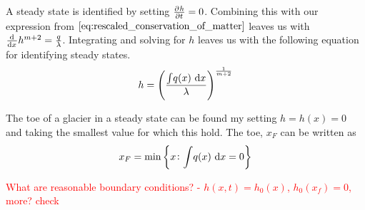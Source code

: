 \label{sec:steady_state}

A steady state is identified by setting $\pd{h}{t} = 0$. Combining this with our expression from $\eqref{eq:rescaled_conservation_of_matter}$ leaves us with $ \od{}{x}h^{m+2} = \frac{q}{\lambda}$. Integrating and solving for $h$ leaves us with the following equation for identifying steady states.
%
\begin{equation}
    h = \left(\frac{{\int}q(x)\,\dif{x}}{\lambda}\right)^{\frac{1}{m+2}}
\end{equation}

The toe of a glacier in a steady state can be found my setting $h = h(x) = 0$ and taking the smallest value for which this hold. The toe, $x_F$ can be written as 
%
\begin{equation}
    x_F = \min\left\{x \colon {\int}q(x)\,\dif{x} = 0\right\}
\end{equation}

\textcolor{red}{What are reasonable boundary conditions? - $h(x, t) = h_0(x)$, $h_0(x_f) = 0$, more? check}
